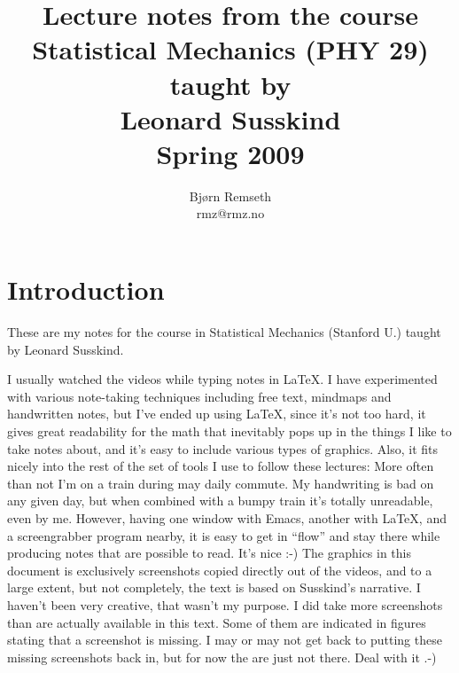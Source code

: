 \documentclass[a4, 12pt, english, USenglish]{scrreprt}
\begin{document}
\title{Lecture notes from the course \\
Statistical Mechanics (PHY 29)\\
taught by \\
Leonard Susskind \\
Spring 2009}

\author{Bj\o{}rn Remseth \\ rmz@rmz.no}

\maketitle
\tableofcontents



\begin{abstract}

\end{abstract}

\chapter*{Introduction}

These are my notes for the course in Statistical Mechanics (Stanford U.) taught by
Leonard Susskind.    

I usually watched the videos while typing notes in \LaTeX.  I have
experimented with various note-taking techniques including free text,
mindmaps and handwritten notes, but I've ended up using \LaTeX, since
it's not too hard, it gives great readability for the math that
inevitably pops up in the things I like to take notes about, and it's
easy to include various types of graphics.  Also, it fits nicely into
the rest of the set of tools I use to follow these lectures: More
often than not I'm on a train during may daily commute.  My
handwriting is bad on any given day, but when combined with a bumpy
train it's totally unreadable, even by me.  However, having one window
with Emacs, another with \LaTeX, and a screengrabber program nearby,
it is easy to get in ``flow'' and stay there while producing notes
that are possible to read.  It's nice :-) The graphics in this
document is exclusively screenshots copied directly out of the videos,
and to a large extent, but not completely, the text is based on
Susskind's narrative.  I haven't been very creative, that wasn't my
purpose.  I did take more screenshots than are actually available in
this text.  Some of them are indicated in figures stating that a
screenshot is missing.  I may or may not get back to putting these
missing screenshots back in, but for now the are just not there.  Deal
with it .-)
\end{document}
